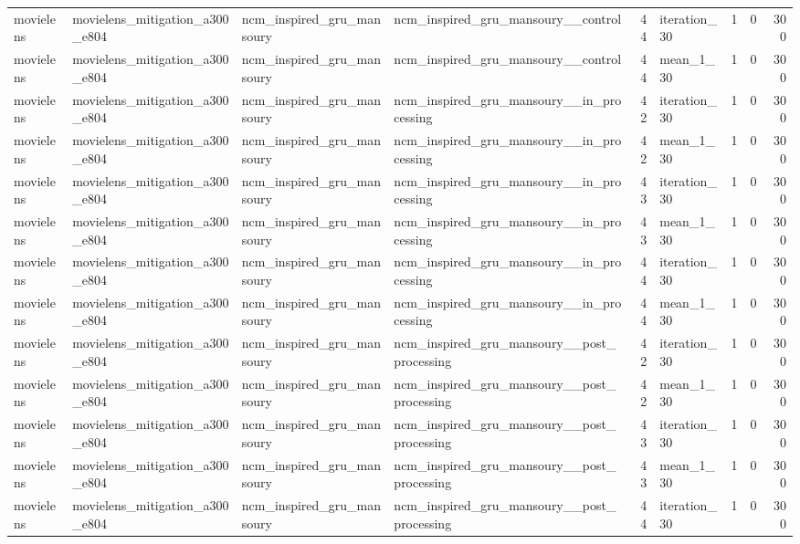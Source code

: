 \begin{table}[htbp!]
\begin{tabular}{llllrlrrr}
movielens & movielens\_mitigation\_a300\_e804 & ncm\_inspired\_gru\_mansoury & ncm\_inspired\_gru\_mansoury\_\_control & 44 & iteration\_30 & 1 & 0 & 300 \\
movielens & movielens\_mitigation\_a300\_e804 & ncm\_inspired\_gru\_mansoury & ncm\_inspired\_gru\_mansoury\_\_control & 44 & mean\_1\_30 & 1 & 0 & 300 \\
movielens & movielens\_mitigation\_a300\_e804 & ncm\_inspired\_gru\_mansoury & ncm\_inspired\_gru\_mansoury\_\_in\_processing & 42 & iteration\_30 & 1 & 0 & 300 \\
movielens & movielens\_mitigation\_a300\_e804 & ncm\_inspired\_gru\_mansoury & ncm\_inspired\_gru\_mansoury\_\_in\_processing & 42 & mean\_1\_30 & 1 & 0 & 300 \\
movielens & movielens\_mitigation\_a300\_e804 & ncm\_inspired\_gru\_mansoury & ncm\_inspired\_gru\_mansoury\_\_in\_processing & 43 & iteration\_30 & 1 & 0 & 300 \\
movielens & movielens\_mitigation\_a300\_e804 & ncm\_inspired\_gru\_mansoury & ncm\_inspired\_gru\_mansoury\_\_in\_processing & 43 & mean\_1\_30 & 1 & 0 & 300 \\
movielens & movielens\_mitigation\_a300\_e804 & ncm\_inspired\_gru\_mansoury & ncm\_inspired\_gru\_mansoury\_\_in\_processing & 44 & iteration\_30 & 1 & 0 & 300 \\
movielens & movielens\_mitigation\_a300\_e804 & ncm\_inspired\_gru\_mansoury & ncm\_inspired\_gru\_mansoury\_\_in\_processing & 44 & mean\_1\_30 & 1 & 0 & 300 \\
movielens & movielens\_mitigation\_a300\_e804 & ncm\_inspired\_gru\_mansoury & ncm\_inspired\_gru\_mansoury\_\_post\_processing & 42 & iteration\_30 & 1 & 0 & 300 \\
movielens & movielens\_mitigation\_a300\_e804 & ncm\_inspired\_gru\_mansoury & ncm\_inspired\_gru\_mansoury\_\_post\_processing & 42 & mean\_1\_30 & 1 & 0 & 300 \\
movielens & movielens\_mitigation\_a300\_e804 & ncm\_inspired\_gru\_mansoury & ncm\_inspired\_gru\_mansoury\_\_post\_processing & 43 & iteration\_30 & 1 & 0 & 300 \\
movielens & movielens\_mitigation\_a300\_e804 & ncm\_inspired\_gru\_mansoury & ncm\_inspired\_gru\_mansoury\_\_post\_processing & 43 & mean\_1\_30 & 1 & 0 & 300 \\
movielens & movielens\_mitigation\_a300\_e804 & ncm\_inspired\_gru\_mansoury & ncm\_inspired\_gru\_mansoury\_\_post\_processing & 44 & iteration\_30 & 1 & 0 & 300 \\

\end{tabular}
\end{table}
